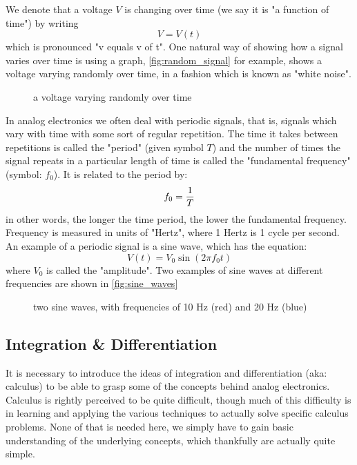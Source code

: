 \documentclass{memoir}
\begin{document}
	We denote that a voltage $V$ is changing over time (we say it is "a function of time") by writing 
	\begin{equation}
		V=V\left(t\right)
	\end{equation}
	which is pronounced "v equals v of t". One natural way of showing how a signal varies over time is using a graph, \autoref{fig:random_signal} for example, shows a voltage varying randomly over time, in a fashion which is known as "white noise".
	\begin{figure}
		\caption{\label{fig:random_signal}a voltage varying randomly over time}
	\end{figure}
	
	In analog electronics we often deal with periodic signals, that is, signals which vary with time with some sort of regular repetition. The time it takes between repetitions is called the "period" (given symbol $T$) and the number of times the signal repeats in a particular length of time is called the "fundamental frequency" (symbol: $f_0$). It is related to the period by:
	\begin{equation}
		f_0 = {1 \over T }
	\end{equation}
	in other words, the longer the time period, the lower the fundamental frequency. Frequency is measured in units of "Hertz", where 1 Hertz is 1 cycle per second. An example of a periodic signal is a sine wave, which has the equation:
	\begin{equation}
		V\left(t\right) = V_0 \sin\left(2 \pi f_0  t\right)
	\end{equation} 
	where $V_0$ is called the "amplitude". Two examples of sine waves at different frequencies are shown in \autoref{fig:sine_waves}
	
	\begin{figure}
		\caption{\label{fig:sine_waves}two sine waves, with frequencies of 10 Hz (red) and 20 Hz (blue)}
	\end{figure}
	
	\subsection{Integration \& Differentiation}
	It is necessary to introduce the ideas of integration and differentiation (aka: calculus) to be able to grasp some of the concepts behind analog electronics. Calculus is rightly perceived to be quite difficult, though much of this difficulty is in learning and applying the various techniques to actually solve specific calculus problems. None of that is needed here, we simply have to gain basic understanding of the underlying concepts, which thankfully are actually quite simple. 
	
\end{document}
